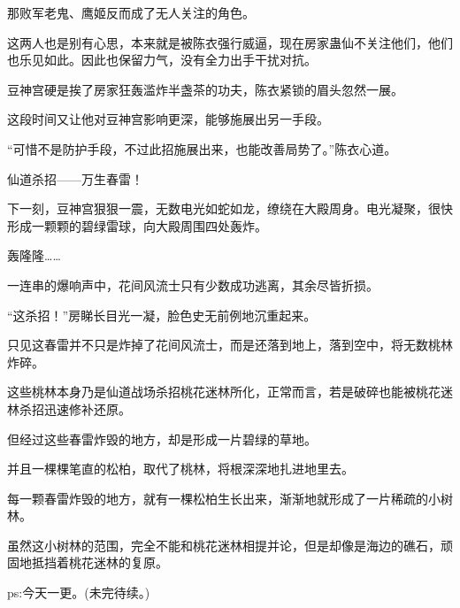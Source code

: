 \begin{this_body}
那败军老鬼、鹰姬反而成了无人关注的角色。

这两人也是别有心思，本来就是被陈衣强行威逼，现在房家蛊仙不关注他们，他们也乐见如此。因此也保留力气，没有全力出手干扰对抗。

豆神宫硬是挨了房家狂轰滥炸半盏茶的功夫，陈衣紧锁的眉头忽然一展。

这段时间又让他对豆神宫影响更深，能够施展出另一手段。

“可惜不是防护手段，不过此招施展出来，也能改善局势了。”陈衣心道。

仙道杀招——万生春雷！

下一刻，豆神宫狠狠一震，无数电光如蛇如龙，缭绕在大殿周身。电光凝聚，很快形成一颗颗的碧绿雷球，向大殿周围四处轰炸。

轰隆隆……

一连串的爆响声中，花间风流士只有少数成功逃离，其余尽皆折损。

“这杀招！”房睇长目光一凝，脸色史无前例地沉重起来。

只见这春雷并不只是炸掉了花间风流士，而是还落到地上，落到空中，将无数桃林炸碎。

这些桃林本身乃是仙道战场杀招桃花迷林所化，正常而言，若是破碎也能被桃花迷林杀招迅速修补还原。

但经过这些春雷炸毁的地方，却是形成一片碧绿的草地。

并且一棵棵笔直的松柏，取代了桃林，将根深深地扎进地里去。

每一颗春雷炸毁的地方，就有一棵松柏生长出来，渐渐地就形成了一片稀疏的小树林。

虽然这小树林的范围，完全不能和桃花迷林相提并论，但是却像是海边的礁石，顽固地抵挡着桃花迷林的复原。

ps:今天一更。(未完待续。)

\end{this_body}

